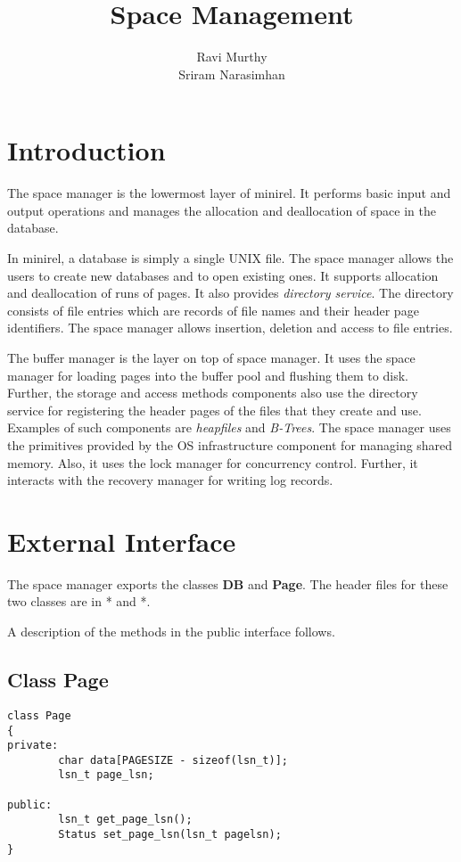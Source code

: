 \title{Space Management}
\author{Ravi Murthy \\
        Sriram Narasimhan}
\date{}

\maketitle

\section{Introduction}

The space manager is the lowermost layer of minirel. It performs basic
input and output    operations and    manages the    allocation    and
deallocation of space in the database.

In minirel, a database is simply a single UNIX file. The space manager
allows the users to create new databases and to open existing ones. It
supports allocation    and  deallocation of runs   of   pages. It also
provides {\em directory  service}.  The  directory  consists of   file
entries which   are  records of  file  names  and   their header  page
identifiers. The  space manager allows  insertion, deletion and access
to file entries.

The buffer manager is the  layer on top of  space manager. It uses the
space manager for loading pages into the buffer pool and flushing them
to disk. Further,  the storage and access  methods components also use
the directory service for  registering the header  pages of the  files
that  they   create and use.   Examples   of such  components are {\em
heapfiles} and {\em B-Trees}.  The  space manager uses the  primitives
provided by   the OS   infrastructure component  for  managing  shared
memory.   Also,   it  uses     the   lock manager     for  concurrency
control.  Further, it interacts  with the recovery manager for writing
log records.


\section{External Interface}

The  space manager exports  the classes  {\bf DB}  and {\bf Page}. The
header files for these two classes are in * and *.



A description of the methods in the public interface follows.

\subsection{Class Page}
\begin{verbatim}
class Page
{
private:
        char data[PAGESIZE - sizeof(lsn_t)];
        lsn_t page_lsn;

public:
        lsn_t get_page_lsn();
        Status set_page_lsn(lsn_t pagelsn);
}
\end{verbatim}

